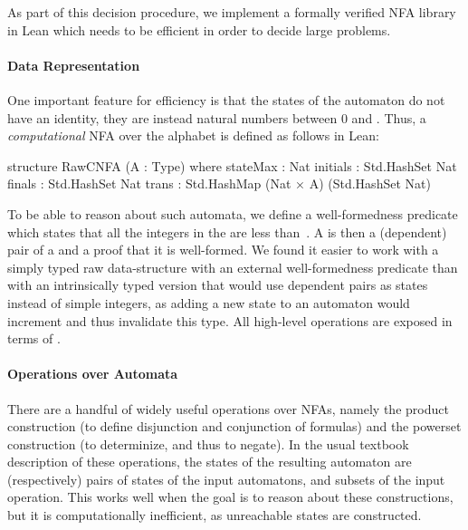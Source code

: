 As part of this decision procedure, we implement a formally verified NFA library
in Lean which needs to be efficient in order to decide large problems.

\paragraph{Data Representation}

One important feature for efficiency is that the states of the automaton do not
have an identity, they are instead natural numbers between 0 and
. Thus, a \emph{computational} NFA over the alphabet
 is defined as follows in Lean:

\begin{lean}
  structure RawCNFA (A : Type) where
    stateMax : Nat
    initials : Std.HashSet Nat
    finals   : Std.HashSet Nat
    trans    : Std.HashMap (Nat × A) (Std.HashSet Nat)
\end{lean}

To be able to reason about such automata, we define a well-formedness predicate
 which states that all the integers in the
 are less than~.
%
A  is then a (dependent) pair of a  and a
proof that it is well-formed.
%
We found it easier to work with a simply typed raw data-structure with an
external well-formedness predicate than with an intrinsically typed version that
would use dependent pairs  as states
instead of simple integers, as adding a new state to an automaton would
increment  and thus invalidate this type.
%
All high-level operations are exposed in terms of
.

\paragraph{Operations over Automata}

There are a handful of widely useful operations over NFAs, namely the product
construction (to define disjunction and conjunction of formulas) and the
powerset construction (to determinize, and thus to negate).
%
In the usual textbook description of these operations, the states of the
resulting automaton are (respectively) pairs of states of the input automatons,
and subsets of the input operation. This works well when the goal is to reason
about these constructions, but it is computationally inefficient, as
unreachable states are constructed.

